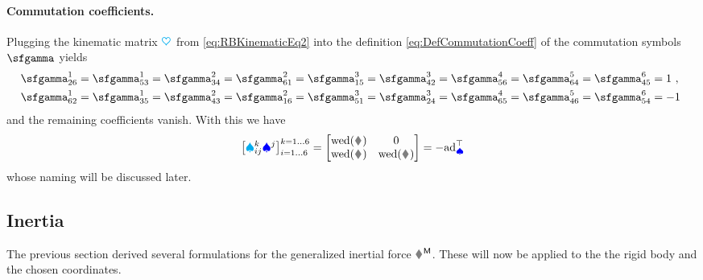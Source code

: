 \paragraph*{Commutation coefficients.}
Plugging the kinematic matrix $\boldsymbol{\textcolor{cyan}{\heartsuit}}$ from \eqref{eq:RBKinematicEq2} into the definition \eqref{eq:DefCommutationCoeff} of the commutation symbols $\bodyBoltzSym{}{}{}$ yields
\begin{align}\label{eq:RBCommutationCoeff}
 \bodyBoltzSym{1}{2}{6} = \bodyBoltzSym{1}{5}{3} = 
 \bodyBoltzSym{2}{3}{4} = \bodyBoltzSym{2}{6}{1} =
 \bodyBoltzSym{3}{1}{5} = \bodyBoltzSym{3}{4}{2} =
 \bodyBoltzSym{4}{5}{6} =
 \bodyBoltzSym{5}{6}{4} = 
 \bodyBoltzSym{6}{4}{5} &= 1 \ ,
\nonumber\\
 \bodyBoltzSym{1}{6}{2} = \bodyBoltzSym{1}{3}{5} = 
 \bodyBoltzSym{2}{4}{3} = \bodyBoltzSym{2}{1}{6} =
 \bodyBoltzSym{3}{5}{1} = \bodyBoltzSym{3}{2}{4} =
 \bodyBoltzSym{4}{6}{5} =
 \bodyBoltzSym{5}{4}{6} = 
 \bodyBoltzSym{6}{5}{4} &= -1 \ 
\end{align}
and the remaining coefficients vanish.
With this we have
\begin{align}\label{eq:RBCommutationCoeffAd}
 \big[ \BoltzSym{\LidxIII}{\LidxI}{\LidxII} \sysVelCoeff{\LidxII} \big]^{\LidxIII=1\ldots6}_{\LidxI=1\ldots6} =
 \begin{bmatrix} \wedOp(\bodyAngVel{}{}) & 0 \\ \wedOp(\bodyLinVel{}{}) & \wedOp(\bodyAngVel{}{}) \end{bmatrix}
 = -\ad{\sysVel}^\top
\end{align}
whose naming will be discussed later.


\subsection{Inertia}
The previous section derived several formulations for the generalized inertial force $\bodyGenForceInertia{}{}$.
These will now be applied to the the rigid body and the chosen coordinates.

